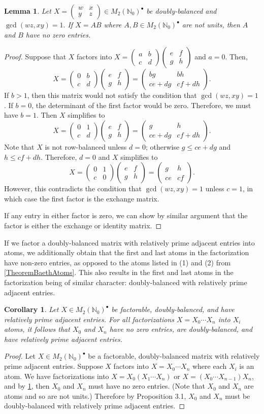 \documentclass{amsart}
\newcommand{\pmx}[4]{\begin{pmatrix} #1 & #2 \\ #3 & #4 \end{pmatrix}}
\newcommand{\mtwo}{M_2(\mathbb{N}_0)^\bullet}
\newtheorem{lemma}[theorem]{Lemma}
\newtheorem{cor}[theorem]{Corollary}
\begin{document}
\begin{lemma}\label{LemmaNoZeroes} Let $X=\pmx{w}{x}{y}{z}\in \mtwo$ be doubly-balanced and $\gcd{(wz, xy)}=1.$ If $X=AB$ where $A, B \in \mtwo$ are not units, then $A$ and $B$ have no zero entries.
\end{lemma}
\begin{proof}
    Suppose that $X$ factors into $X=\pmx{a}{b}{c}{d}\pmx{e}{f}{g}{h}$ and $a=0$. Then,
    \[X=\pmx{0}{b}{c}{d}\pmx{e}{f}{g}{h}=\pmx{bg}{bh}{ce+dg}{cf+dh}.\]
    If $b>1$, then this matrix would not satisfy the condition that $\gcd(wz,xy)=1$. If $b=0$, the determinant of the first factor would be zero. Therefore, we must have $b=1$. Then $X$ simplifies to 
    \[X=\pmx{0}{1}{c}{d}\pmx{e}{f}{g}{h}=\pmx{g}{h}{ce+dg}{cf+dh}.\]
    Note that $X$ is not row-balanced unless $d=0$; otherwise $g\leq ce+dg$ and $h\leq cf+dh$. Therefore, $d=0$ and $X$ simplifies to
    \[X=\pmx{0}{1}{c}{0}\pmx{e}{f}{g}{h}=\pmx{g}{h}{ce}{cf}.\]
    However, this contradicts the condition that $\gcd(wz, xy)=1$ unless $c=1$, in which case the first factor is the exchange matrix.

    If  any entry in either factor is zero, we can show by similar argument that the factor is either the exchange or identity matrix.
\end{proof}



If we factor a doubly-balanced matrix with relatively prime adjacent entries into atoms, we additionally obtain that the first and last atoms in the factorization have non-zero entries, as opposed to the atoms listed in (1) and (2) from \cref{TheoremBaethAtoms}. This also results in the first and last atoms in the factorization being of similar character: doubly-balanced with relatively prime adjacent entries.



\begin{cor}\label{lem:bookends}
Let $X\in \mtwo$ be factorable, doubly-balanced, and have relatively prime adjacent entries. For all factorizations $X=X_0\cdots X_n$ into $X_i$ atoms, it follows that $X_0$ and $X_n$ have no zero entries, are doubly-balanced, and have relatively prime adjacent entries.
\end{cor}



\begin{proof}
Let $X \in \mtwo$ be a factorable, doubly-balanced matrix with relatively prime adjacent entries. Suppose $X$ factors into $X=X_0\cdots X_n$ where each $X_i$ is an atom. We have factorizations into $X = X_0 (X_1 \cdots X_n)$ or $X = (X_0 \cdots X_{n-1}) X_n$, and by \cref{LemmaNoZeroes}, then $X_0$ and $X_n$ must have no zero entries. (Note that $X_0$ and $X_n$ are atoms and so are not units.) Therefore by Proposition 3.1, $X_0$ and $X_n$ must be doubly-balanced with relatively prime adjacent entries.
\end{proof}
\end{document}
